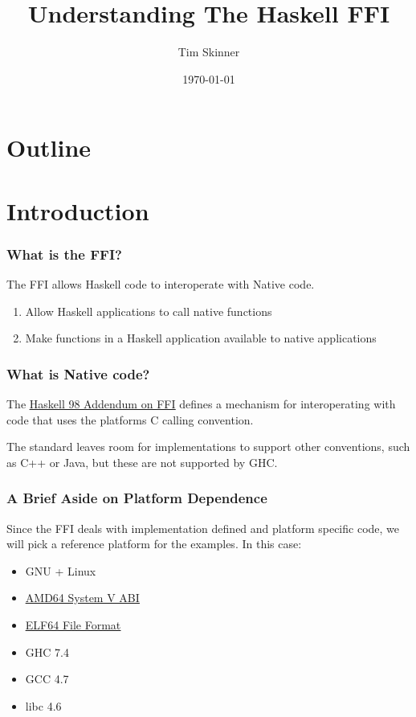 \documentclass{beamer}
\title{Understanding The Haskell FFI}
\author{Tim Skinner}
\date{\today}
\newcommand{\chref}[3] {
    {\color{#1} \href{#2}{\underline{#3}}}
}
\begin{document}
\begin{frame}
    \titlepage
\end{frame}

\section*{Outline}
\begin{frame}
    \begin{tiny}
        \tableofcontents
    \end{tiny}
\end{frame}

\section{Introduction}
\begin{frame}
    \frametitle{What is the FFI?}
    The FFI allows Haskell code to interoperate with Native code.
    \begin{enumerate}
        \item{Allow Haskell applications to call native functions}
        \item{Make functions in a Haskell application available to native
            applications}
    \end{enumerate}
\end{frame}

\begin{frame}
    \frametitle{What is Native code?}

    The \chref{darkgray}
    {http://www.cse.unsw.edu.au/~chak/haskell/ffi/ffi/ffi.html} {Haskell 98
    Addendum on FFI} defines a mechanism for interoperating with code that uses
    the platforms C calling convention.

    The standard leaves room for implementations to support other conventions,
    such as C++ or Java, but these are not supported by GHC.
\end{frame}

\begin{frame}
    \frametitle{A Brief Aside on Platform Dependence}

    Since the FFI deals with implementation defined and platform specific code,
    we will pick a reference platform for the examples.  In this case:

    \begin{itemize}
        \item {GNU + Linux}
        \item {\chref{darkgray}{http://www.uclibc.org/docs/psABI-x86_64.pdf}{AMD64 System V ABI}}
        \item {\chref{darkgray}{http://downloads.openwatcom.org/ftp/devel/docs/elf-64-gen.pdf}{ELF64 File Format}}
        \item {GHC 7.4}
        \item {GCC 4.7}
        \item {libc 4.6}
    \end{itemize}
\end{frame}
\end{document}
